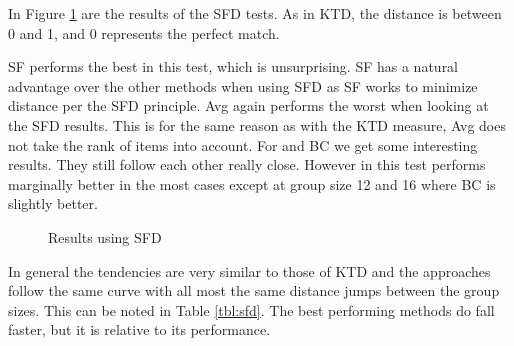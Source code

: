 In Figure \ref{fig:footruledistance} are the results of the SFD tests. As in KTD, the distance is between 0 and 1, and 0 represents the perfect match.

SF performs the best in this test, which is unsurprising. SF has a natural advantage over the other methods when using SFD as SF works to minimize distance per the SFD principle. Avg again performs the worst when looking at the SFD results. This is for the same reason as with the KTD measure, Avg does not take the rank of items into account. For \MC and BC we get some interesting results. They still follow each other really close. However in this test \MC performs marginally better in the most cases except at group size 12 and 16 where BC is slightly better.

\begin{figure}[H]
\caption{Results using SFD} \label{fig:footruledistance}
\end{figure}

In general the tendencies are very similar to those of KTD and the approaches follow the same curve with all most the same distance jumps between the group sizes. This can be noted in Table \ref{tbl:sfd}. The best performing methods do fall faster, but it is relative to its performance.

